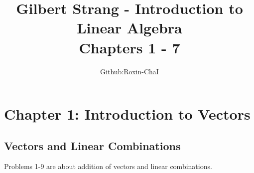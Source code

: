 \documentclass[14pt, a4paper]{article}
\title{\textbf{Gilbert Strang - Introduction to Linear Algebra} \\ \Large Chapters 1 - 7}
\author{Github:Roxin-ChaI}
\date{}
\begin{document}
\bfseries
\maketitle
\vspace{-1cm}

\tableofcontents
\newpage

\section{Chapter 1: Introduction to Vectors}

\subsection{Vectors and Linear Combinations}
\noindent Problems 1-9 are about addition of vectors and linear combinations.
\end{document}
